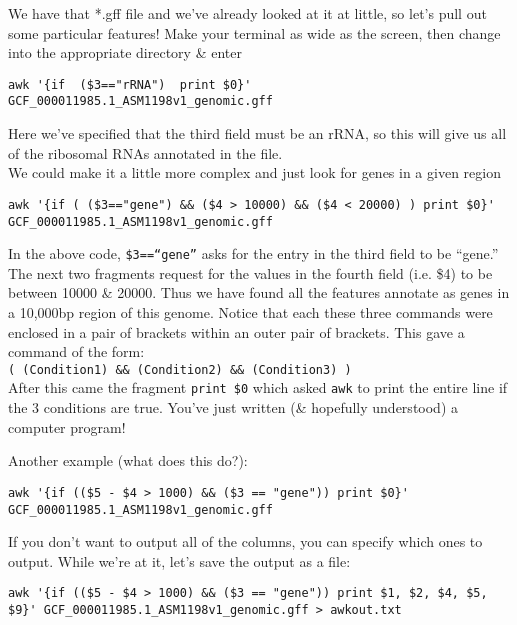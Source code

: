 \begin{steps}
We have that *.gff file and we've already looked at it at little, so let's pull out some particular features!
Make your terminal as wide as the screen, then change into the appropriate directory \& enter
\begin{lstlisting}
awk '{if  ($3=="rRNA")  print $0}' GCF_000011985.1_ASM1198v1_genomic.gff
\end{lstlisting}
Here we've specified that the third field must be an rRNA, so this will give us all of the ribosomal RNAs annotated in the file. \\

We could make it a little more complex and just look for genes in a given region
\begin{lstlisting}
awk '{if ( ($3=="gene") && ($4 > 10000) && ($4 < 20000) ) print $0}' GCF_000011985.1_ASM1198v1_genomic.gff
\end{lstlisting}
\end{steps}
\begin{note}
In the above code, \texttt{\$3==``gene''} asks for the entry in the third field to be ``gene.''
The next two fragments request for the values in the fourth field (i.e. \$4) to be between 10000 \& 20000.
Thus we have found all the features annotate as genes in a 10,000bp region of this genome.
Notice that each these three commands were enclosed in a pair of brackets within an outer pair of brackets.
This gave a command of the form: \\
\texttt{( (Condition1) \&\& (Condition2) \&\& (Condition3) )} \\
After this came the fragment \texttt{print \$0} which asked \texttt{awk} to print the entire line if the 3 conditions are true.
You've just written (\& hopefully understood) a computer program!
\end{note}

\begin{steps}
Another example (what does this do?): \\
\begin{lstlisting}
awk '{if (($5 - $4 > 1000) && ($3 == "gene")) print $0}' GCF_000011985.1_ASM1198v1_genomic.gff 
\end{lstlisting}
If you don't want to output all of the columns, you can specify which ones to output.  
While we're at it, let's save the output as a file: \\
\begin{lstlisting}
awk '{if (($5 - $4 > 1000) && ($3 == "gene")) print $1, $2, $4, $5, $9}' GCF_000011985.1_ASM1198v1_genomic.gff > awkout.txt
\end{lstlisting}
\end{steps}

